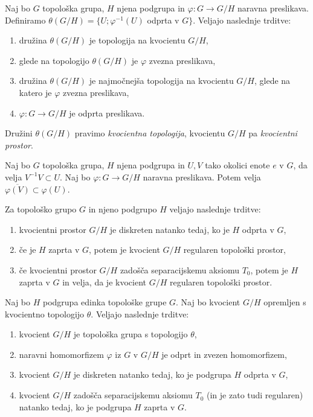 \documentclass[mat1]{fmfdelo}
\newcommand{\closure}[1]{\overline{#1}}
\begin{document}
\begin{izrek}\label{izr:topkvocienta}
Naj bo $G$ topološka grupa, $H$ njena podgrupa in $\varphi: G \to G/H$ naravna preslikava. Definiramo $\theta(G/H) = \lbrace U ; \varphi^{-1}(U)$ odprta v $G \rbrace$.
Veljajo naslednje trditve:
\begin{enumerate}
\item družina $\theta(G/H)$ je topologija na kvocientu $G/H$,
\item glede na topologijo $\theta(G/H)$ je $\varphi$ zvezna preslikava,
\item družina $\theta(G/H)$ je najmočnejša topologija na kvocientu $G/H$, glede na katero je $\varphi$ zvezna preslikava,
\item $\varphi: G \to G/H$ je odprta preslikava.
\end{enumerate}
\end{izrek}

Družini $\theta(G/H)$ pravimo \emph{kvocientna topologija}, kvocientu $G/H$ pa \emph{kvocientni prostor}.


\begin{trditev}\label{trd:okolicevkvoc}
Naj bo $G$ topološka grupa, $H$ njena podgrupa in $U, V$ tako okolici enote $e$ v $G$, da velja $V^{-1}V \subset U$. Naj bo $\varphi: G \to G/H$ naravna preslikava. Potem velja $\closure{\varphi(V)} \subset \varphi(U)$.
\end{trditev}

\begin{izrek}
Za topološko grupo $G$ in njeno podgrupo $H$ veljajo naslednje trditve:
\begin{enumerate}
\item kvocientni prostor $G/H$ je diskreten natanko tedaj, ko je $H$ odprta v $G$,
\item če je $H$ zaprta v $G$, potem je kvocient $G/H$ regularen topološki prostor,
\item če kvocientni prostor $G/H$ zadošča separacijskemu aksiomu $T_0$, potem je $H$ zaprta v $G$ in velja, da je kvocient $G/H$ regularen topološki prostor.
\end{enumerate}
\end{izrek}

\begin{izrek}\label{izr:kvocpovzetek}
Naj bo $H$ podgrupa edinka topološke grupe $G$. Naj bo kvocient $G/H$ opremljen s kvocientno topologijo $\theta$. Veljajo naslednje trditve:
\begin{enumerate}
\item kvocient $G/H$ je topološka grupa s topologijo $\theta$,
\item naravni homomorfizem $\varphi$ iz $G$ v $G/H$ je odprt in zvezen homomorfizem,
\item kvocient $G/H$ je diskreten natanko tedaj, ko je podgrupa $H$ odprta v $G$,
\item kvocient $G/H$ zadošča separacijskemu aksiomu $T_0$ (in je zato tudi regularen) natanko tedaj, ko je podgrupa $H$ zaprta v $G$.
\end{enumerate}
\end{izrek}
\end{document}
